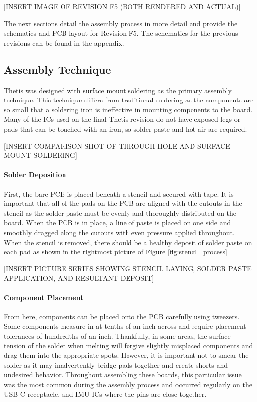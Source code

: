 [INSERT IMAGE OF REVISION F5 (BOTH RENDERED AND ACTUAL)]

The next sections detail the assembly process in more detail and provide the schematics and PCB layout for Revision F5.
The schematics for the previous revisions can be found in the appendix.

\subsection{Assembly Technique} \label{ssec:assembly_techniques}
Thetis was designed with surface mount soldering as the primary assembly technique.
This technique differs from traditional soldering as the components are so small that a soldering iron is ineffective in mounting components to the board.
Many of the ICs used on the final Thetis revision do not have exposed legs or pads that can be touched with an iron, so solder paste and hot air are required.

[INSERT COMPARISON SHOT OF THROUGH HOLE AND SURFACE MOUNT SOLDERING]

\paragraph*{Solder Deposition} First, the bare PCB is placed beneath a stencil and secured with tape.
It is important that all of the pads on the PCB are aligned with the cutouts in the stencil as the solder paste must be evenly and thoroughly distributed on the board.
When the PCB is in place, a line of paste is placed on one side and smoothly dragged along the cutouts with even pressure applied throughout.
When the stencil is removed, there should be a healthy deposit of solder paste on each pad as shown in the rightmost picture of Figure \ref{fig:stencil_process}

[INSERT PICTURE SERIES SHOWING STENCIL LAYING, SOLDER PASTE APPLICATION, AND RESULTANT DEPOSIT]

\paragraph*{Component Placement} From here, components can be placed onto the PCB carefully using tweezers.
Some components measure in at tenths of an inch across and require placement tolerances of hundredths of an inch.
Thankfully, in some areas, the surface tension of the solder when melting will forgive slightly misplaced components and drag them into the appropriate spots.
However, it is important not to smear the solder as it may inadvertently bridge pads together and create shorts and undesired behavior.
Throughout assembling these boards, this particular issue was the most common during the assembly process and occurred regularly on the USB-C receptacle, and IMU ICs where the pins are close together.

